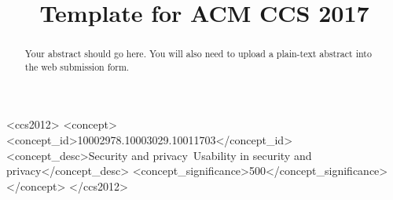\documentclass[sigconf, anonymous]{acmart}
\begin{document}
\title{Template for ACM CCS 2017} %

\begin{abstract}
Your abstract should go here. You will also need to upload a plain-text abstract into the web submission form.
\end{abstract}

\begin{CCSXML}
<ccs2012>
<concept>
<concept_id>10002978.10003029.10011703</concept_id>
<concept_desc>Security and privacy~Usability in security and privacy</concept_desc>
<concept_significance>500</concept_significance>
</concept>
</ccs2012>
\end{CCSXML}



\maketitle





\end{document}
